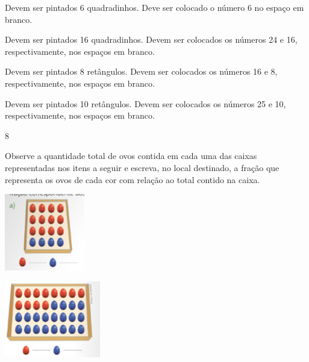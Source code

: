 \begin{mdframed}[linewidth=2pt,linecolor=salmao,roundcorner=2pt]
\begin{escolha}
{{\begin{escolha}
\item
  Devem ser pintados 6 quadradinhos. Deve ser colocado o número 6 no espaço em
  branco.
\item
  Devem ser pintados 16 quadradinhos. Devem ser colocados os números 24 e 16,
  respectivamente, nos espaços em branco.
\item
  Devem ser pintados 8 retângulos. Devem ser colocados os números 16 e 8,
  respectivamente, nos espaços em branco.
\item
  Devem ser pintados 10 retângulos. Devem ser colocados os números 25 e 10,
  respectivamente, nos espaços em branco.
\end{escolha}

\num{8}

Observe a quantidade total de ovos contida em cada uma das caixas
representadas nos itens a seguir e escreva, no local destinado, a fração que
representa os ovos de cada cor com relação ao total contido na caixa.


\begin{escolha}
\item
\end{escolha}

\includegraphics[width=1.37512in,height=1.31678in]{media/image118.png}

\begin{escolha}
\item
\end{escolha}

\includegraphics[width=1.64181in,height=1.30845in]{media/image119.png}

}}
\end{escolha}
\end{mdframed}
